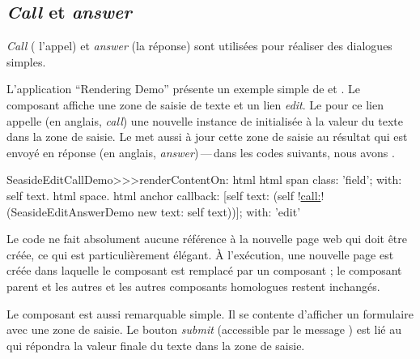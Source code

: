\documentclass[a4paper,10pt,twoside]{book}
\begin{document}
\subsection{\emph{Call} et \emph{answer}}

\emph{Call} (\cad{} l'appel) et \emph{answer} (\cad la réponse) sont utilisées
pour réaliser des dialogues simples.

L'application ``Rendering Demo'' présente un exemple simple de
 et .
Le composant  affiche une zone de saisie de
texte et un lien \emph{edit}.
Le \callback pour ce lien appelle (en anglais, \emph{call}) une nouvelle instance de
 initialisée à la valeur du texte dans la
zone de saisie.
Le \callback met aussi à jour cette zone de saisie au résultat qui est
envoyé en réponse (en anglais, \emph{answer})\,---\,dans les codes
suivants, nous avons . %

\begin{code}{}
SeasideEditCallDemo>>>renderContentOn: html
	html span
		class: 'field';
		with: self text.
	html space.
	html anchor
		callback: [self text: (self !\underline{call:}! (SeasideEditAnswerDemo new text: self text))];
		with: 'edit'
\end{code}{}

Le code ne fait absolument aucune référence à la nouvelle page web qui
doit être créée, ce qui est particulièrement élégant.
À l'exécution, une nouvelle page est créée dans laquelle le composant
 est remplacé par un composant
; le composant parent et les autres et les
autres composants homologues restent inchangés.


Le composant  est aussi remarquable simple.
Il se contente d'afficher un formulaire avec une zone de saisie.
Le bouton \emph{submit} 
(\brush accessible par le message )
est lié au \callback qui répondra la valeur finale du texte dans la
zone de saisie.
\end{document}
